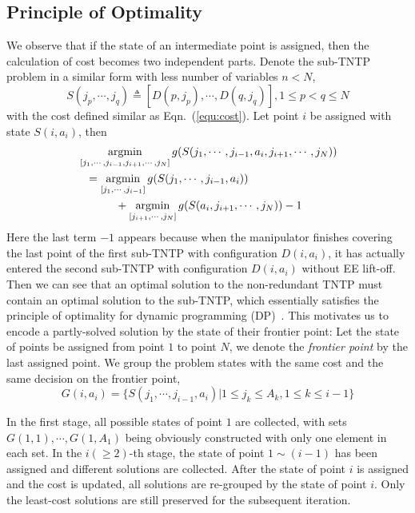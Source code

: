 \documentclass[letterpaper, 10 pt, conference]{ieeeconf}  %
\begin{document}
\subsection{Principle of Optimality}

We observe that if the state of an intermediate point is assigned, then the calculation of cost becomes two independent parts. Denote the sub-TNTP problem in a similar form with less number of variables $n<N$, 
\begin{equation}
S(j_p, \cdots, j_q) \triangleq [D(p, j_p), \cdots, D(q, j_q)], 1\leq p <q \leq N
\end{equation}
with the cost defined similar as Eqn.~(\ref{equ:cost}). 
Let point $i$ be assigned with state $S(i, a_i)$, then 
\begin{equation}
\begin{aligned}
&\mathop{\rm argmin}\limits_{[j_1, \cdots, j_{i-1}, j_{i+1}, \cdots, j_N]} g(S(j_1, \cdots, j_{i-1}, a_i, j_{i+1}, \cdots, j_N))\\
&~~= \mathop{\rm argmin}\limits_{[j_1, \cdots, j_{i-1}]} g(S(j_1, \cdots, j_{i-1}, a_i))\\
&~~~~~~~~~~+\mathop{\rm argmin}\limits_{[j_{i+1}, \cdots, j_N]} g(S(a_i, j_{i+1}, \cdots, j_N))-1
\end{aligned}
\end{equation}
Here the last term $-1$ appears because when the manipulator finishes covering the last point of the first sub-TNTP with configuration $D(i, a_i)$, it has actually entered the second sub-TNTP with configuration $D(i, a_i)$ without EE lift-off. 
Then we can see that an optimal solution to the non-redundant TNTP must contain an optimal solution to the sub-TNTP, which essentially satisfies the principle of optimality for dynamic programming (DP)~\cite{Bellman2013Dynamic}. 
This motivates us to encode a partly-solved solution by the state of their frontier point:  
Let the state of points be assigned from point $1$ to point $N$, we denote the \textit{frontier point} by the last assigned point. 
We group the problem states with the same cost and the same decision on the frontier point, 
\begin{equation}
G(i, a_i) = \{S(j_1, \cdots, j_{i-1}, a_i)|1\leq j_k \leq A_k, 1\leq k\leq i-1\}
\end{equation}

In the first stage, all possible states of point $1$ are collected, with sets $G(1, 1), \cdots, G(1, A_1)$ being obviously constructed with only one element in each set. 
In the $i(\geq 2)$-th stage, the state of point $1\sim(i-1)$ has been assigned and different solutions are collected. After the state of point $i$ is assigned and the cost is updated, all solutions are re-grouped by the state of point $i$. Only the least-cost solutions are still preserved for the subsequent iteration. 
\end{document}
